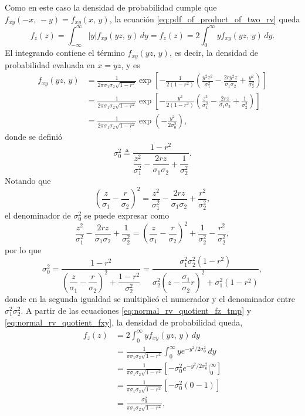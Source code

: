 \documentclass[a4paper]{report}
\begin{document}
Como en este caso la densidad de probabilidad cumple que \(f_{xy}(-x,\,-y)=f_{xy}(x,\,y)\), la ecuación \ref{eq:pdf_of_product_of_two_rv} queda
\begin{equation}\label{eq:normal_rv_quotient_fz_tmp}
 f_z(z)=\int_{-\infty}^{\infty}|y|f_{xy}(yz,\,y)\,dy=f_z(z)=2\int_{0}^{\infty}yf_{xy}(yz,\,y)\,dy.
\end{equation}
El integrando contiene el término \(f_{xy}(yz,\,y)\), es decir, la densidad de probabilidad evaluada en \(x=yz\), y es
\begin{align}\label{eq:normal_rv_quotient_fxy}
 f_{xy}(yz,\,y)&=\frac{1}{2\pi\sigma_1\sigma_2\sqrt{1-r^2}}\exp\left[-\frac{1}{2(1-r^2)}\left(\frac{y^2z^2}{\sigma_1^2}-\frac{2ry^2z}{\sigma_1\sigma_2}+\frac{y^2}{\sigma_2^2}\right)\right]\nonumber\\
   &=\frac{1}{2\pi\sigma_1\sigma_2\sqrt{1-r^2}}\exp\left[-\frac{y^2}{2(1-r^2)}\left(\frac{z^2}{\sigma_1^2}-\frac{2rz}{\sigma_1\sigma_2}+\frac{1}{\sigma_2^2}\right)\right]\nonumber\\
   &=\frac{1}{2\pi\sigma_1\sigma_2\sqrt{1-r^2}}\exp\left(-\frac{y^2}{2\sigma_0^2}\right),
\end{align}
donde se definió
\[
 \sigma_0^2\triangleq\dfrac{1-r^2}{\dfrac{z^2}{\sigma_1^2}-\dfrac{2rz}{\sigma_1\sigma_2}+\dfrac{1}{\sigma_2^2}}.
\]
Notando que 
\[
 \left(\frac{z}{\sigma_1}-\frac{r}{\sigma_2}\right)^2=\frac{z^2}{\sigma_1^2}-\frac{2rz}{\sigma_1\sigma_2}+\frac{r^2}{\sigma_2^2},
\]
el denominador de \(\sigma_0^2\) se puede expresar como
\[
 \frac{z^2}{\sigma_1^2}-\frac{2rz}{\sigma_1\sigma_2}+\frac{1}{\sigma_2^2}=\left(\frac{z}{\sigma_1}-\frac{r}{\sigma_2}\right)^2+\frac{1}{\sigma^2_2}-\frac{r^2}{\sigma^2_2},
\]
por lo que
\begin{equation}\label{eq:normal_rv_quotient_sigma_0}
 \sigma_0^2=\dfrac{1-r^2}{\left(\dfrac{z}{\sigma_1}-\dfrac{r}{\sigma_2}\right)^2+\dfrac{1-r^2}{\sigma^2_2}}
   =\dfrac{\sigma_1^2\sigma_2^2\left(1-r^2\right)}{\sigma_2^2\left(z-\dfrac{\sigma_1}{\sigma_2}r\right)^2+\sigma_1^2(1-r^2)},
\end{equation}
donde en la segunda igualdad se multiplicó el numerador y el denominador entre \(\sigma_1^2\sigma_2^2\).
A partir de las ecuaciones \ref{eq:normal_rv_quotient_fz_tmp} y \ref{eq:normal_rv_quotient_fxy}, la densidad de probabilidad queda,
\begin{align*}
 f_z(z)&=2\int_{0}^{\infty}yf_{xy}(yz,\,y)\,dy\\
   &=\frac{1}{\pi\sigma_1\sigma_2\sqrt{1-r^2}}\int_{0}^{\infty}ye^{-y^2/2\sigma_0^2}\,dy\\
   &=\frac{1}{\pi\sigma_1\sigma_2\sqrt{1-r^2}}\left[-\sigma_0^2e^{-y^2/2\sigma_0^2}\bigg|_{0}^{\infty}\right]\\
   &=\frac{1}{\pi\sigma_1\sigma_2\sqrt{1-r^2}}\left[-\sigma_0^2\left(0-1\right)\right]\\
   &=\frac{\sigma_0^2}{\pi\sigma_1\sigma_2\sqrt{1-r^2}},
\end{align*}
\end{document}

